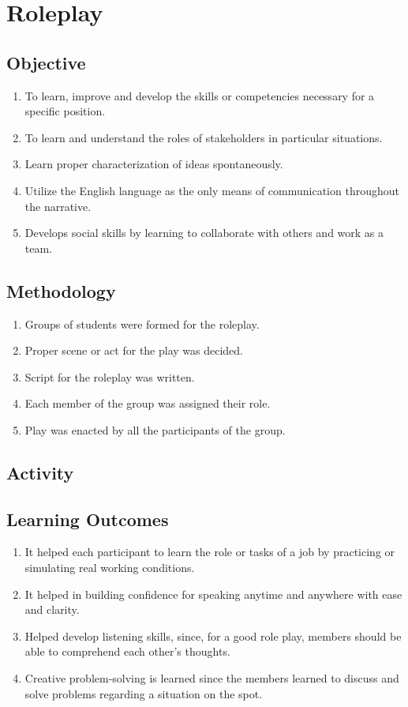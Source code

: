 \pagebreak

\section{Roleplay}

\subsection{Objective}
\begin{enumerate}
    \item To learn, improve and develop the skills or competencies necessary for a specific
          position.
    \item To learn and understand the roles of stakeholders in particular situations.
    \item Learn proper characterization of ideas spontaneously.
    \item Utilize the English language as the only means of communication throughout the
          narrative.
    \item Develops social skills by learning to collaborate with others and work as a team.
\end{enumerate}

\subsection{Methodology}
\begin{enumerate}
    \item Groups of students were formed for the roleplay.
    \item Proper scene or act for the play was decided.
    \item Script for the roleplay was written.
    \item Each member of the group was assigned their role.
    \item Play was enacted by all the participants of the group.
\end{enumerate}

\subsection{Activity}

\subsection{Learning Outcomes}
\begin{enumerate}
    \item It helped each participant to learn the role or tasks of a job by practicing or simulating
          real working conditions.
    \item It helped in building confidence for speaking anytime and anywhere with ease and
          clarity.
    \item Helped develop listening skills, since, for a good role play, members should be able
          to comprehend each other's thoughts.
    \item Creative problem-solving is learned since the members learned to discuss and solve
          problems regarding a situation on the spot.
\end{enumerate}

